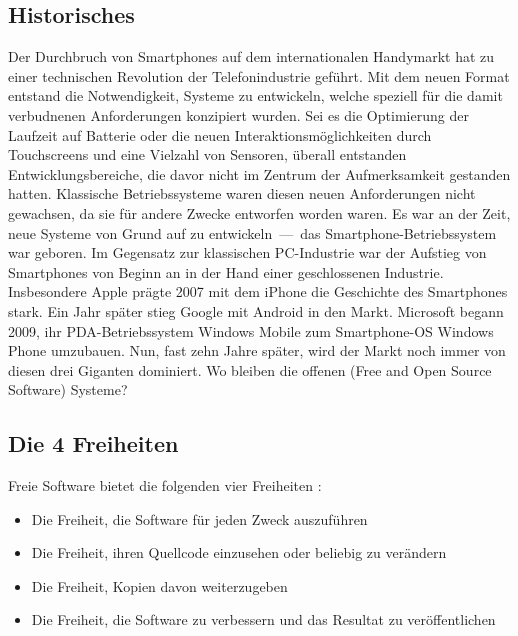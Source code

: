 \subsection{Historisches}
Der Durchbruch von Smartphones auf dem internationalen Handymarkt hat zu einer technischen Revolution der Telefonindustrie geführt. Mit dem neuen Format entstand die Notwendigkeit, Systeme zu entwickeln, welche speziell für die damit verbudnenen Anforderungen konzipiert wurden. Sei es die Optimierung der Laufzeit auf Batterie oder die neuen Interaktionsmöglichkeiten durch Touchscreens und eine Vielzahl von Sensoren, überall entstanden Entwicklungsbereiche, die davor nicht im Zentrum der Aufmerksamkeit gestanden hatten. Klassische Betriebssysteme waren diesen neuen Anforderungen nicht gewachsen, da sie für andere Zwecke entworfen worden waren. Es war an der Zeit, neue Systeme von Grund auf zu \mbox{entwickeln --- das} \mbox{Smartphone-Betriebssystem} war geboren.
Im Gegensatz zur klassischen \mbox{PC-Industrie} war der Aufstieg von Smartphones von Beginn an in der Hand einer geschlossenen Industrie. Insbesondere Apple prägte 2007 mit dem iPhone die Geschichte des Smartphones stark. Ein Jahr später stieg Google mit Android in den Markt. Microsoft begann 2009, ihr \mbox{PDA-Betriebssystem} Windows Mobile zum \mbox{Smartphone-OS} Windows Phone umzubauen. Nun, fast zehn Jahre später, wird der Markt noch immer von diesen drei Giganten dominiert. Wo bleiben die offenen (Free and Open Source Software) Systeme?\\

\subsection{Die 4 Freiheiten}
Freie Software bietet die folgenden vier Freiheiten \cite{online:fsf_vier-freiheiten}:
\begin{itemize}
	\renewcommand\labelitemi{--}
	\item Die Freiheit, die Software für jeden Zweck auszuführen
	\item  Die Freiheit, ihren Quellcode einzusehen oder beliebig zu verändern
	\item Die Freiheit, Kopien davon weiterzugeben
	\item Die Freiheit, die Software zu verbessern und das Resultat zu veröffentlichen
\end{itemize}

\medskip
